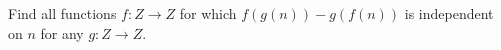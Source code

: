 Find all functions $f : Z \to Z$ for which $f(g(n)) - g(f(n))$ is independent on $n$ for any $g : Z \to Z$.